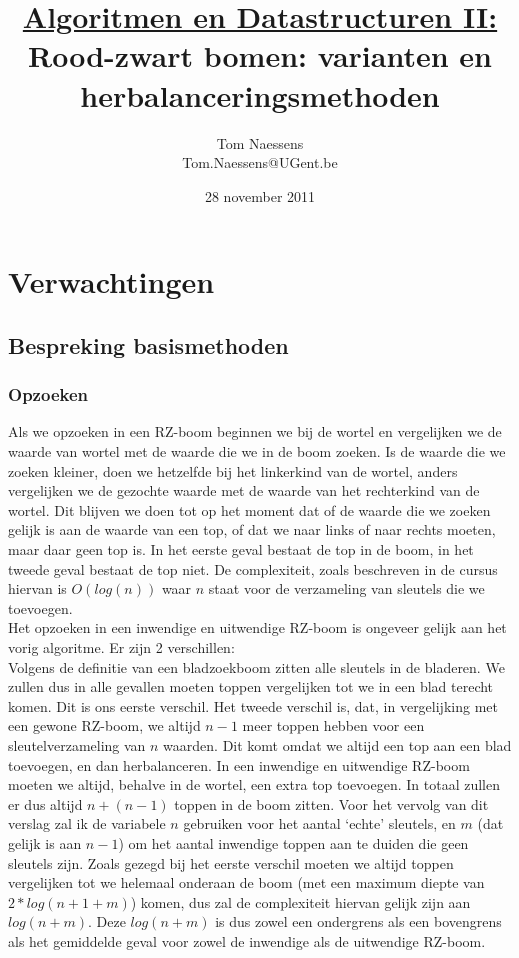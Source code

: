 \documentclass[11pt,a4paper]{report}
\title{\underline{Algoritmen en Datastructuren II:}\\ Rood-zwart bomen: varianten en herbalanceringsmethoden}
\author{Tom Naessens\\ Tom.Naessens@UGent.be}
\date{28 november 2011}
\begin{document}
\maketitle
\tableofcontents

\chapter{Verwachtingen}   

\section{Bespreking basismethoden}
\subsection*{Opzoeken}
\label{opzoeken}
Als we opzoeken in een RZ-boom beginnen we bij de wortel en vergelijken we de waarde van wortel met de waarde die we in de boom zoeken. Is de waarde die we zoeken kleiner, doen we hetzelfde bij het linkerkind van de wortel, anders vergelijken we de gezochte waarde met de waarde van het rechterkind van de wortel. Dit blijven we doen tot op het moment dat of de waarde die we zoeken gelijk is aan de waarde van een top, of dat we naar links of naar rechts moeten, maar daar geen top is. In het eerste geval bestaat de top in de boom, in het tweede geval bestaat de top niet. De complexiteit, zoals beschreven in de cursus hiervan is $O(log(n))$ waar $n$ staat voor de verzameling van sleutels die we toevoegen.\\
Het opzoeken in een inwendige en uitwendige RZ-boom is ongeveer gelijk aan het vorig algoritme. Er zijn 2 verschillen:\\
Volgens de definitie van een bladzoekboom zitten alle sleutels in de bladeren. We zullen dus in alle gevallen moeten toppen vergelijken tot we in een blad terecht komen. Dit is ons eerste verschil. Het tweede verschil is, dat, in vergelijking met een gewone RZ-boom, we altijd $n-1$ meer toppen hebben voor een sleutelverzameling van $n$ waarden. Dit komt omdat we altijd een top aan een blad toevoegen, en dan herbalanceren. In een inwendige en uitwendige RZ-boom moeten we altijd, behalve in de wortel, een extra top toevoegen. In totaal zullen er dus altijd $n+(n-1)$ toppen in de boom zitten. Voor het vervolg van dit verslag zal ik de variabele $n$ gebruiken voor het aantal `echte' sleutels, en $m$ (dat gelijk is aan $n-1$) om het aantal inwendige toppen aan te duiden die geen sleutels zijn. Zoals gezegd bij het eerste verschil moeten we altijd toppen vergelijken tot we helemaal onderaan de boom (met een maximum diepte van $2*log(n+1+m)$) komen, dus zal de complexiteit hiervan gelijk zijn aan $log(n+m)$. Deze $log(n+m)$ is dus zowel een ondergrens als een bovengrens als het gemiddelde geval voor zowel de inwendige als de uitwendige RZ-boom.
\end{document}
